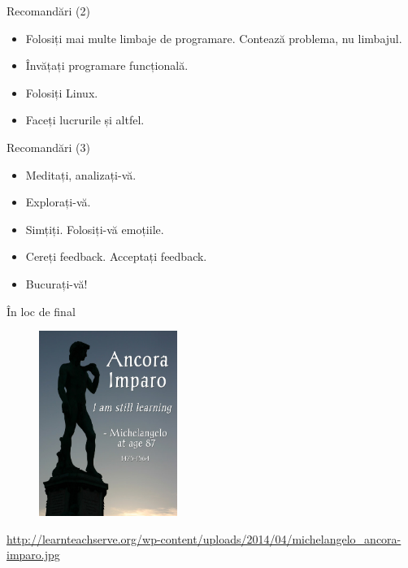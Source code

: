 \documentclass{beamer}
\begin{document}
\begin{frame}{Recomandări (2)}
  \begin{itemize}
    \pause \item Folosiți mai multe limbaje de programare. Contează problema, nu limbajul.
    \pause \item Învățați programare funcțională.
    \pause \item Folosiți Linux.
    \pause \item Faceți lucrurile și altfel.
  \end{itemize}
\end{frame}

\begin{frame}{Recomandări (3)}
  \begin{itemize}
    \pause \item Meditați, analizați-vă.
    \pause \item Explorați-vă.
    \pause \item Simțiți. Folosiți-vă emoțiile.
    \pause \item Cereți feedback. Acceptați feedback.
    \pause \item Bucurați-vă!
  \end{itemize}
\end{frame}

\begin{frame}{În loc de final}
  \begin{figure}
    \centering
    \includegraphics[width=0.4\textwidth]{img/michelangelo-ancora-imparo.jpg}
  \end{figure}
  \begin{center}
    \tiny
    \url{http://learnteachserve.org/wp-content/uploads/2014/04/michelangelo_ancora-imparo.jpg}
  \end{center}
\end{frame}
\end{document}
